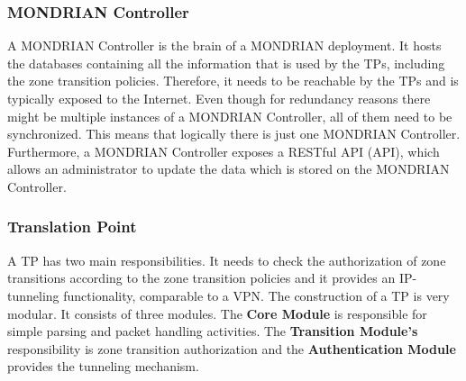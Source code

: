 \subsubsection{MONDRIAN Controller}
A MONDRIAN Controller is the brain of a MONDRIAN deployment. It hosts the databases containing all the information that is used by the \acsp{TP}, including the zone transition policies. Therefore, it needs to be reachable by the \acsp{TP} and is typically exposed to the Internet. Even though for redundancy reasons there might be multiple instances of a MONDRIAN Controller, all of them need to be synchronized. This means that logically there is just one MONDRIAN Controller. Furthermore, a MONDRIAN Controller exposes a \acs{REST}ful \acs{API} (\acl{API}), which allows an administrator to update the data which is stored on the MONDRIAN Controller. 

\subsubsection{Translation Point}
A \acl{TP} has two main responsibilities. It needs to check the authorization of zone transitions according to the zone transition policies and it provides an \acs{IP}-tunneling functionality, comparable to a \acs{VPN}. The construction of a \acs{TP} is very modular. It consists of three modules. The \textbf{Core Module} is responsible for simple parsing and packet handling activities. The \textbf{Transition Module's} responsibility is zone transition authorization and the \textbf{Authentication Module} provides the tunneling mechanism.

